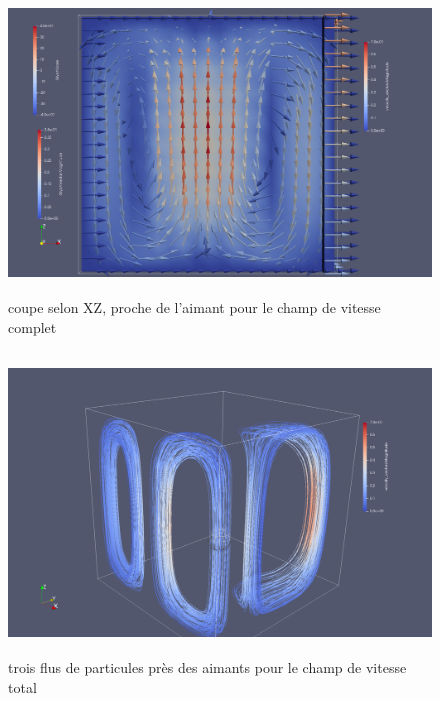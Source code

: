 \documentclass[a4paper,12pt,titlepage]{report}
\begin{document}
\begin{onehalfspace}
\begin{figure}[!h]
\center 
\includegraphics[height = 8cm, keepaspectratio]{graphes/Paraview/total_coupe_pret_aimant_centre.png} 
\caption{\label{figure 3 } coupe selon XZ, proche de l'aimant pour le champ de vitesse complet}
\end{figure}

\begin{figure}[!h]
\center 
\includegraphics[height = 8cm, keepaspectratio]{graphes/Paraview/total_3_flux.png} 
\caption{\label{figure 3 }trois flus de particules près des aimants pour le champ de vitesse total}
\end{figure}

\newpage


\end{onehalfspace}
\end{document}
